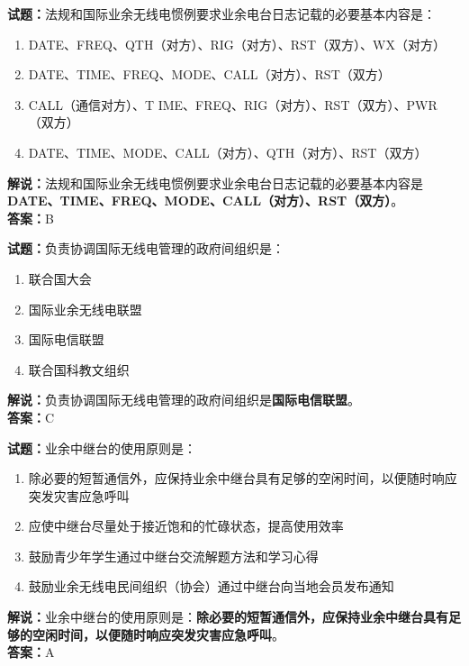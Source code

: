 \documentclass{ctexbook}
\begin{document}
\bigskip


\noindent\textbf{试题：}法规和国际业余无线电惯例要求业余电台日志记载的必要基本内容是：
\begin{enumerate}[leftmargin=3em]
\item DATE、FREQ、QTH（对方）、RIG（对方）、RST（双方）、WX（对方）
\item DATE、TIME、FREQ、MODE、CALL（对方）、RST（双方）
\item CALL（通信对方）、T IME、FREQ、RIG（对方）、RST（双方）、PWR（双方）
\item DATE、TIME、MODE、CALL（对方）、QTH（对方）、RST（双方）
\end{enumerate}
\noindent\textbf{解说：}法规和国际业余无线电惯例要求业余电台日志记载的必要基本内容是\textbf{DATE、TIME、FREQ、MODE、CALL（对方）、RST（双方）}。\\\noindent\textbf{答案：}B


\bigskip


\noindent\textbf{试题：}负责协调国际无线电管理的政府间组织是：
\begin{enumerate}[leftmargin=3em]
\item 联合国大会
\item 国际业余无线电联盟
\item 国际电信联盟
\item 联合国科教文组织
\end{enumerate}
\noindent\textbf{解说：}负责协调国际无线电管理的政府间组织是\textbf{国际电信联盟}。\\\noindent\textbf{答案：}C



\bigskip


\noindent\textbf{试题：}业余中继台的使用原则是：
\begin{enumerate}[leftmargin=3em]
\item 除必要的短暂通信外，应保持业余中继台具有足够的空闲时间，以便随时响应突发灾害应急呼叫
\item 应使中继台尽量处于接近饱和的忙碌状态，提高使用效率
\item 鼓励青少年学生通过中继台交流解题方法和学习心得
\item 鼓励业余无线电民间组织（协会）通过中继台向当地会员发布通知
\end{enumerate}
\noindent\textbf{解说：}业余中继台的使用原则是：\textbf{除必要的短暂通信外，应保持业余中继台具有足够的空闲时间，以便随时响应突发灾害应急呼叫}。\\\noindent\textbf{答案：}A
\end{document}
